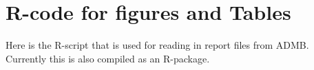 \section{R-code for figures and Tables}


Here is the R-script that is used for reading in report files from ADMB.  Currently this is also compiled as an R-package.
\begin{scriptsize}

\end{scriptsize}
